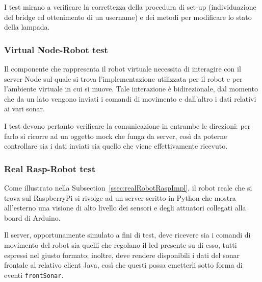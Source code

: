 \documentclass{../llncs}
\newcommand{\codescript}[1]{{\mbox{\small{\texttt{#1}}}}\xspace}
\newcommand{\xss}[1]{\subsectionname~\ref{ssec:#1}}
\newcommand{\subsectionname}{Subsection}
\begin{document}
I test mirano a verificare la correttezza della procedura di set-up (individuazione del bridge ed ottenimento di un username) e dei metodi per modificare lo stato della lampada.


\subsubsection{Virtual Node-Robot test}
Il componente che rappresenta il robot virtuale necessita di interagire con il server Node sul quale si trova l'implementazione utilizzata per il robot e per l'ambiente virtuale in cui si muove. Tale interazione è bidirezionale, dal momento che da un lato vengono inviati i comandi di movimento e dall'altro i dati relativi ai vari sonar.

I test devono pertanto verificare la comunicazione in entrambe le direzioni: per farlo si ricorre ad un oggetto mock che funga da server, così da poterne controllare sia i dati inviati sia quello che viene effettivamente ricevuto.\\



\subsubsection{Real Rasp-Robot test}
Come illustrato nella \xss{realRobotRaspImpl}, il robot reale che si trova sul RaspberryPi si rivolge ad un server scritto in Python che mostra all'esterno una visione di alto livello dei sensori e degli attuatori collegati alla board di Arduino.

Il server, opportunamente simulato a fini di test, deve ricevere sia i comandi di movimento del robot sia quelli che regolano il led presente su di esso, tutti espressi nel giusto formato; inoltre, deve rendere disponibili i dati del sonar frontale al relativo client Java, così che questi possa emetterli sotto forma di eventi \codescript{frontSonar}.\\


\end{document}
